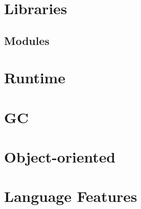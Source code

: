 \documentclass[svgnames,12pt,a4paper]{book}
\begin{document}
  
  
  
  
  
  
  
  

\chapter{Libraries}























\section{Modules}


\chapter{Runtime}
\label{sec:runtime}



\chapter{GC}
\label{sec:gc}



\chapter{Object-oriented}



\chapter{Language Features}
\label{sec:compl-lang-feat}









\end{document}
